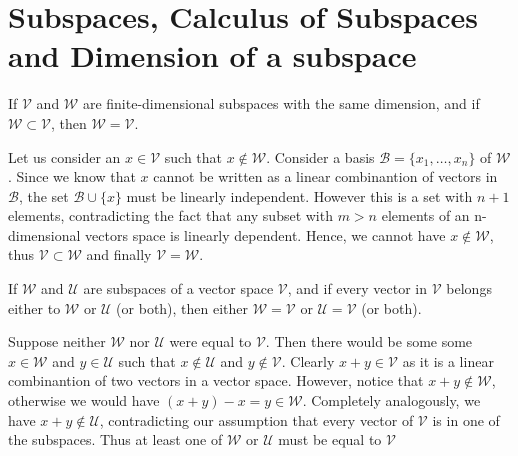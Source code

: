 \section{Subspaces, Calculus of Subspaces and Dimension of a subspace}

\begin{problem}
  If $\mathcal{V}$ and $\mathcal{W}$ are finite-dimensional subspaces with the same dimension, and if $\mathcal{W} \subset \mathcal{V}$, then $\mathcal{W} = \mathcal{V}$.
\end{problem}

\begin{solution}
  Let us consider an $x \in \mathcal{V}$ such that $x \notin \mathcal{W}$.
  Consider a basis $\mathcal{B} = \{x_1, \ldots, x_n\}$ of $\mathcal{W}$.
  Since we know that $x$ cannot be written as a linear combinantion of vectors in $\mathcal{B}$, the set $\mathcal{B} \cup \{x\}$ must be linearly independent.
  However this is a set with $n + 1$ elements, contradicting the fact that any subset with $m > n$ elements of an n-dimensional vectors space is linearly dependent.
  Hence, we cannot have $x \notin \mathcal{W}$, thus $\mathcal{V} \subset \mathcal{W}$ and finally $\mathcal{V} = \mathcal{W}$.
\end{solution}

\begin{problem}
  If $\mathcal{W}$ and $\mathcal{U}$ are subspaces of a vector space $\mathcal{V}$, and if every vector in $\mathcal{V}$ belongs either to $\mathcal{W}$ or $\mathcal{U}$ (or both), then either $\mathcal{W} = \mathcal{V}$ or $\mathcal{U} = \mathcal{V}$ (or both).
\end{problem}

\begin{solution}
  Suppose neither $\mathcal{W}$ nor $\mathcal{U}$ were equal to $\mathcal{V}$.
  Then there would be some some $x \in \mathcal{W}$ and $y \in \mathcal{U}$ such that $x \notin \mathcal{U}$ and $y \notin \mathcal{V}$.
  Clearly $x + y \in \mathcal{V}$ as it is a linear combinantion of two vectors in a vector space.
  However, notice that $x + y \notin \mathcal{W}$, otherwise we would have $(x + y) - x = y \in \mathcal{W}$.
  Completely analogously, we have $x + y \notin \mathcal{U}$, contradicting our assumption that every vector of $\mathcal{V}$ is in one of the subspaces.
  Thus at least one of $\mathcal{W}$ or $\mathcal{U}$ must be equal to $\mathcal{V}$
\end{solution}

